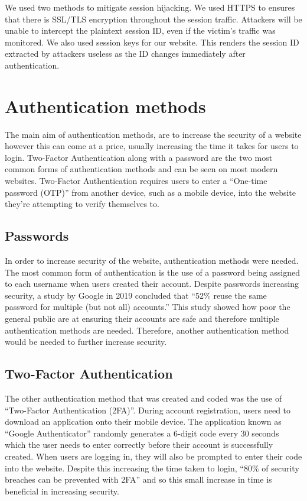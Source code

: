 \documentclass{cmpstyle}
\begin{document}
We used two methods to mitigate session hijacking. We used HTTPS to ensures that there is SSL/TLS encryption throughout the session traffic. Attackers will be unable to intercept the plaintext session ID, even if the victim’s traffic was monitored. We also used session keys for our website. This renders the session ID extracted by attackers useless as the ID changes immediately after authentication. 
\section{Authentication methods}	
The main aim of authentication methods, are to increase the security of a website however this can come at a price, usually increasing the time it takes for users to login. Two-Factor Authentication along with a password are the two most common forms of authentication methods and can be seen on most modern websites. Two-Factor Authentication requires users to enter a “One-time password (OTP)” from another device, such as a mobile device, into the website they’re attempting to verify themselves to.
\subsection{Passwords}
In order to increase security of the website, authentication methods were needed. The most common form of authentication is the use of a password being assigned to each username when users created their account. Despite passwords increasing security, a study by Google in 2019 concluded that “52\% reuse the same password for multiple (but not all) accounts.” \cite{OnlineSurvey} This study showed how poor the general public are at ensuring their accounts are safe and therefore multiple authentication methods are needed. Therefore, another authentication method would be needed to further increase security.
\subsection{Two-Factor Authentication}
The other authentication method that was created and coded was the use of “Two-Factor Authentication (2FA)”. During account registration, users need to download an application onto their mobile device. The application known as “Google Authenticator” randomly generates a 6-digit code every 30 seconds which the user needs to enter correctly before their account is successfully created. When users are logging in, they will also be prompted to enter their code into the website. Despite this increasing the time taken to login, “80\% of security breaches can be prevented with 2FA” \cite{2FAStatisitics} and so this small increase in time is beneficial in increasing security.
 	
\end{document}
